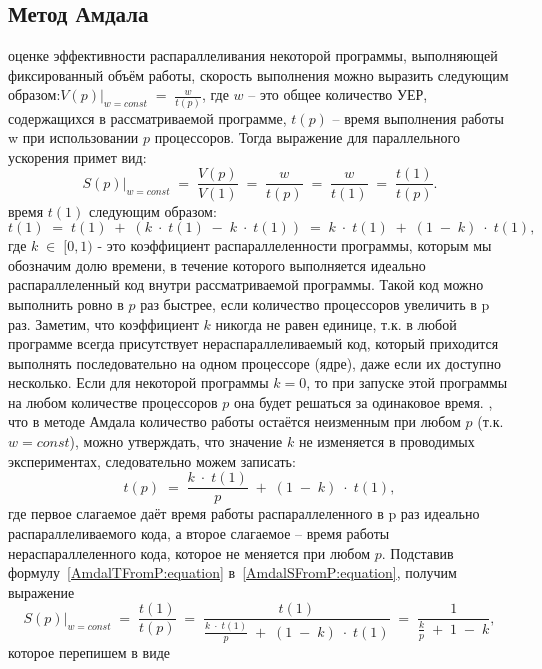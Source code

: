 { %
	\subsection{Метод Амдала}
	\Large{} оценке эффективности распараллеливания некоторой программы, выполняющей фиксированный объём работы, скорость выполнения можно выразить следующим образом:$\left.V(p)\right|_{w=const}\;=\;\frac w{t(p)}$, где $w$ – это общее количество УЕР, содержащихся в рассматриваемой программе, $t(p)$ – время выполнения работы w при использовании $p$ процессоров. Тогда выражение для параллельного ускорения примет вид:
	\begin{equation}
		\label{AmdalSFromP:equation}
		\left.S(p)\right|_{w=const}\;=\;\frac{V(p)}{V(1)}\;=\;\frac w{t(p)}\;=\;\frac w{t(1)}\;=\;\frac{t(1)}{t(p)}.
	\end{equation}
	 время $t(1)$ следующим образом:
	\begin{equation}
		t(1)\;=\;t(1)\;+\;(k\;\cdot\;t(1)\;-\;k\;\cdot\;t(1))\;=\;k\;\cdot\;t(1)\;+\;(1\;-\;k)\;\cdot\;t(1),
	\end{equation}
	где $k\;\in\;\lbrack0,1)$ - это коэффициент распараллеленности программы, которым мы обозначим долю времени, в течение которого выполняется идеально распараллеленный код внутри рассматриваемой программы. Такой код можно выполнить ровно в $p$ раз быстрее, если количество процессоров увеличить в p раз. Заметим, что коэффициент $k$ никогда не равен единице, т.к. в любой программе всегда присутствует нераспараллеливаемый код, который приходится выполнять последовательно на одном процессоре (ядре), даже если их доступно несколько. Если для некоторой программы $k=0$, то при запуске этой программы на любом количестве процессоров $p$ она будет решаться за одинаковое время.
	, что в методе Амдала количество работы остаётся неизменным при любом $p$ (т.к. $w=const$), можно утверждать, что значение $k$ не изменяется в проводимых экспериментах, следовательно можем записать:
	\begin{equation}
		\label{AmdalTFromP:equation}
		t(p)\;=\;\frac{k\;\cdot\;t(1)}p\;+\;(1\;-\;k)\;\cdot\;t(1),
	\end{equation}
	где первое слагаемое даёт время работы распараллеленного в p раз идеально распараллеливаемого кода, а второе слагаемое – время работы нераспараллеленного кода, которое не меняется при любом $p$. Подставив формулу~\eqref{AmdalTFromP:equation} в~\eqref{AmdalSFromP:equation}, получим выражение $$\left.S(p)\right|_{w=const}\;=\;\frac{t(1)}{t(p)}\;=\;\frac{t(1)}{{\displaystyle\frac{k\;\cdot\;t(1)}p}\;+\;(1\;-\;k)\;\cdot\;t(1)}\;=\;\frac1{{\displaystyle\frac kp}\;+\;1\;-\;k},$$ которое перепишем в виде
}

